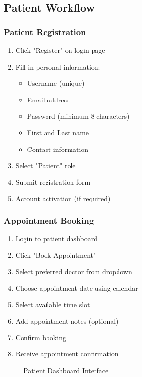 \documentclass[12pt,a4paper]{article}
\begin{document}
\subsection{Patient Workflow}

\subsubsection{Patient Registration}

\begin{enumerate}
    \item Click "Register" on login page
    \item Fill in personal information:
    \begin{itemize}
        \item Username (unique)
        \item Email address
        \item Password (minimum 8 characters)
        \item First and Last name
        \item Contact information
    \end{itemize}
    \item Select "Patient" role
    \item Submit registration form
    \item Account activation (if required)
\end{enumerate}

\subsubsection{Appointment Booking}

\begin{enumerate}
    \item Login to patient dashboard
    \item Click "Book Appointment"
    \item Select preferred doctor from dropdown
    \item Choose appointment date using calendar
    \item Select available time slot
    \item Add appointment notes (optional)
    \item Confirm booking
    \item Receive appointment confirmation
\end{enumerate}

\begin{figure}[H]
\centering
{}
\caption{Patient Dashboard Interface}
\end{figure}
\end{document}

